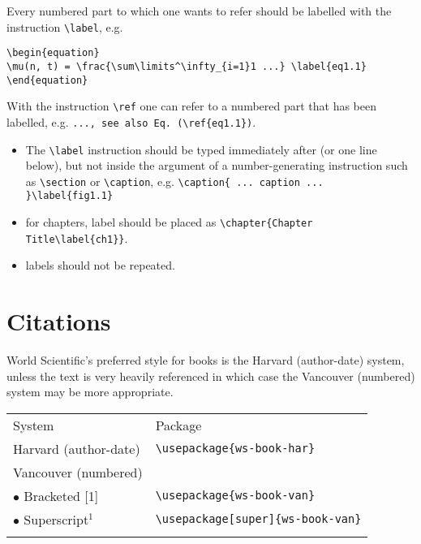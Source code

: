 Every numbered part to which one wants to refer
should be labelled with the instruction \verb|\label|, e.g.

\begin{verbatim}
\begin{equation}
\mu(n, t) = \frac{\sum\limits^\infty_{i=1}1 ...} \label{eq1.1}
\end{equation}
\end{verbatim}

With the instruction \verb|\ref| one can refer to a numbered part
that has been labelled, e.g. \verb|..., see also Eq. (\ref{eq1.1})|.

\begin{itemize}
\item The \verb|\label| instruction should be typed
immediately after (or one line below), but not inside the argument of
a number-generating instruction such as \verb|\section| or \verb|\caption|, e.g.
\verb|\caption{ ... caption ... }\label{fig1.1}|
\item for chapters, label should be placed as
    \verb|\chapter{Chapter Title\label{ch1}}|.
\item labels should not be repeated.
\end{itemize}

\section{Citations}

World Scientific's preferred style for books is the Harvard (author-date) system,
unless the text is very heavily referenced in which case the
Vancouver (numbered) system may be more appropriate.

\begin{center}
\tablefont
\begin{tabular}{@{}ll@{}}\toprule
System & Package\\\colrule
 Harvard (author-date) & \verb|\usepackage{ws-book-har}|\\
 Vancouver (numbered)\\
 \quad$\bullet$ Bracketed [1] & \verb|\usepackage{ws-book-van}|\\
 \quad$\bullet$ Superscript$^1$ & \verb|\usepackage[super]{ws-book-van}|\\\botrule
\end{tabular}
\end{center}

